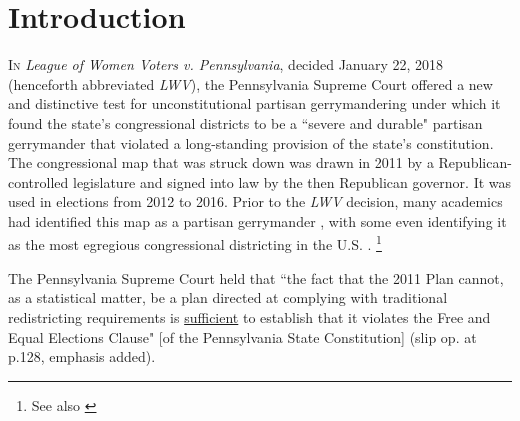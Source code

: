     \section{Introduction}
    \lettrine[lines=3, lraise=0.1, nindent=0em]{\color{lightgray}I}{n} \textit{League of Women Voters v. Pennsylvania}, decided January 22, 2018 (henceforth abbreviated \textit{LWV}), the Pennsylvania Supreme Court offered a new and distinctive test for unconstitutional partisan gerrymandering under which it found the state’s congressional districts to be a ``severe and durable" partisan gerrymander that violated a long-standing provision of the state’s constitution. The congressional map that was struck down was drawn in 2011 by a Republican-controlled legislature and signed into law by the then Republican governor. It was used in elections from 2012 to 2016. Prior to the \textit{LWV} decision, many academics had identified this map as a partisan gerrymander \citep[see e.g.,][]{Royden2017}, with some even identifying it as the most egregious congressional districting in the U.S. \citep[][ esp. Figure 3]{Wang2016_SLR}.
        \footnote{See also \citet{Mcgann_et_al_2015_ELJ, McGann_et_al_2016_gerrymandering}}
\par
    The Pennsylvania Supreme Court held that ``the fact that the 2011 Plan cannot, as a statistical matter, be a plan directed at complying with traditional redistricting requirements is \underline{sufficient} to establish that it violates the Free and Equal Elections Clause" [of the Pennsylvania State Constitution] (slip op. at p.128, emphasis added).
